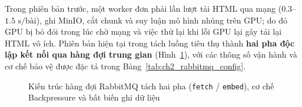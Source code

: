 Trong phiên bản trước, một worker đơn phải lần lượt tải HTML qua mạng ($0.3$--$1.5\text{ s/bài}$), ghi MinIO, cắt chunk và suy luận mô hình nhúng trên GPU; do đó GPU bị bỏ đói trong lúc chờ mạng và việc thử lại khi lỗi GPU lại gây tải lại HTML vô ích. Phiên bản hiện tại trong  tách luồng tiêu thụ thành \textbf{hai pha độc lập kết nối qua hàng đợi trung gian } (Hình~\ref{fig:two_stage_broker}), với các thông số vận hành và cơ chế bảo vệ được đặc tả trong Bảng~\ref{tab:ch2_rabbitmq_config}.

\begin{figure}[htbp]
  \centering
  \DrawTwoStageBroker
  \caption[Kiến trúc hàng đợi RabbitMQ tách hai pha, Backpressure và DLQ]{Kiến trúc hàng đợi RabbitMQ tách hai pha (\texttt{fetch} / \texttt{embed}), cơ chế Backpressure và bất biến ghi dữ liệu}
  \label{fig:two_stage_broker}
\end{figure}

